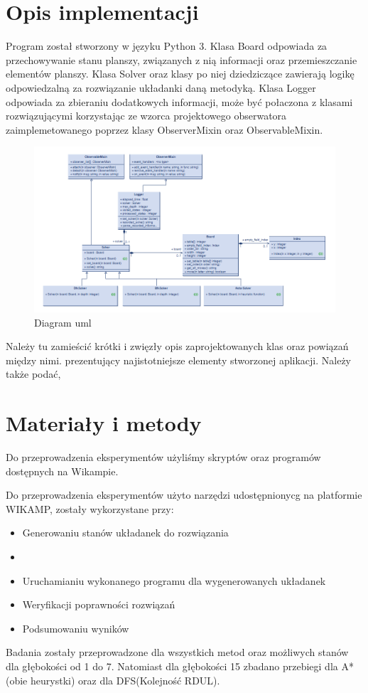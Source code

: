 \documentclass{classrep}
\begin{document}
    \section{Opis implementacji}
    {
    Program został stworzony w języku Python 3.
    Klasa Board odpowiada za przechowywanie stanu planszy, związanych z nią informacji oraz
    przemieszczanie elementów planszy.
    Klasa Solver oraz klasy po niej dziedziczące zawierają logikę odpowiedzalną za rozwiązanie układanki daną metodyką.
    Klasa Logger odpowiada za zbieraniu dodatkowych informacji, może być połaczona z klasami rozwiązującymi
    korzystając ze wzorca projektowego obserwatora zaimplemetowanego poprzez klasy ObserverMixin oraz ObservableMixin.


    \begin{figure}
        \centering
        \includegraphics{diagram}
        \caption{Diagram uml}
        \label{fig:}
    \end{figure}


    Należy tu zamieścić krótki i zwięzły opis zaprojektowanych klas oraz powiązań
    między nimi.
        prezentujący najistotniejsze elementy stworzonej aplikacji. Należy także podać,




    }

    \section{Materiały i metody}
    {
        Do przeprowadzenia eksperymentów użyliśmy skryptów oraz programów dostępnych na Wikampie.

    Do przeprowadzenia eksperymentów użyto narzędzi udostępnionycg na platformie WIKAMP,
    zostały wykorzystane przy:
       \begin{itemize}
            \item Generowaniu stanów układanek do rozwiązania
            \item \item Uruchamianiu wykonanego programu dla wygenerowanych układanek
          \item Weryfikacji poprawności rozwiązań
           \item Podsumowaniu wyników
     \end{itemize}
    Badania zostały przeprowadzone dla wszystkich metod oraz możliwych stanów dla
    głębokości od 1 do 7. Natomiast dla głębokości 15 zbadano przebiegi dla A*(obie heurystki)
    oraz dla DFS(Kolejność RDUL).
    }
\end{document}
